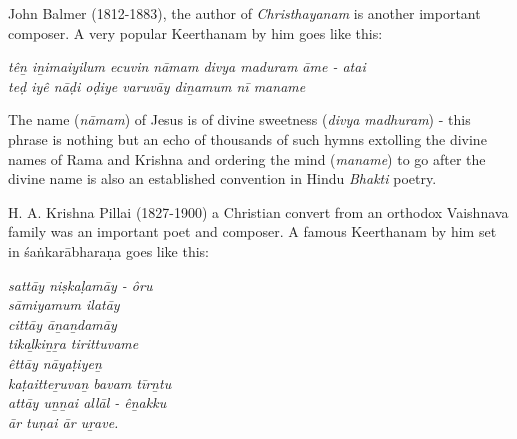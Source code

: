 \vspace{-.1cm}

John Balmer (1812-1883), the author of \textit{Christhayanam} is another important composer. A very popular Keerthanam by him goes like this:

\vspace{-.1cm}

\begin{longquote}
\textit{têṉ iṉimaiyilum ecuvin nāmam divya maduram āme - atai\\ teḍ iyê nāḍi oḍiye varuvāy diṉamum nī maname}
\end{longquote}

\begin{longquote}
\end{longquote}

\vspace{-.1cm}

The name (\textit{nāmam}) of Jesus is of divine sweetness (\textit{divya madhuram}) - this phrase is nothing but an echo of thousands of such hymns extolling the divine names of Rama and Krishna and ordering the mind (\textit{maname}) to go after the divine name is also an established convention in Hindu \textit{Bhakti} poetry.

H. A. Krishna Pillai (1827-1900) a Christian convert from an orthodox Vaishnava family was an important poet and composer. A famous Keerthanam by him set in śaṅkarābharaṇa goes like this:

\begin{centerquote}
\textit{sattāy niṣkaḷamāy - ôru\\ sāmiyamum ilatāy \\ cittāy āṉaṉdamāy\\ tikaḻkiṉṟa tirittuvame\\ êttāy nāyaṭ­iyeṉ\\ kaṭ­aitteṟuvaṉ bavam tīrṉtu\\ attāy uṉṉai allāl - êṉakku\\ ār tuṇai ār uṟave.}
\end{centerquote}

\begin{centerquote}
\end{centerquote}

